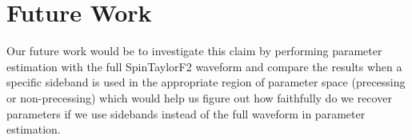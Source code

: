 \section{Future Work}
Our future work would be to investigate this claim by performing parameter estimation with the full SpinTaylorF2 waveform and compare the results when a specific sideband is used in the appropriate region of parameter space (precessing or non-precessing) which would help us figure out how faithfully do we recover parameters if we use sidebands instead of the full waveform in parameter estimation.








